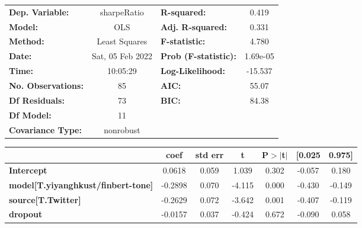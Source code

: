 \begin{center}
\begin{tabular}{lclc}
\toprule
\textbf{Dep. Variable:}                    &   sharpeRatio    & \textbf{  R-squared:         } &     0.419   \\
\textbf{Model:}                            &       OLS        & \textbf{  Adj. R-squared:    } &     0.331   \\
\textbf{Method:}                           &  Least Squares   & \textbf{  F-statistic:       } &     4.780   \\
\textbf{Date:}                             & Sat, 05 Feb 2022 & \textbf{  Prob (F-statistic):} &  1.69e-05   \\
\textbf{Time:}                             &     10:05:29     & \textbf{  Log-Likelihood:    } &   -15.537   \\
\textbf{No. Observations:}                 &          85      & \textbf{  AIC:               } &     55.07   \\
\textbf{Df Residuals:}                     &          73      & \textbf{  BIC:               } &     84.38   \\
\textbf{Df Model:}                         &          11      & \textbf{                     } &             \\
\textbf{Covariance Type:}                  &    nonrobust     & \textbf{                     } &             \\
\bottomrule
\end{tabular}
\begin{tabular}{lcccccc}
                                           & \textbf{coef} & \textbf{std err} & \textbf{t} & \textbf{P$> |$t$|$} & \textbf{[0.025} & \textbf{0.975]}  \\
\midrule
\textbf{Intercept}                         &       0.0618  &        0.059     &     1.039  &         0.302        &       -0.057    &        0.180     \\
\textbf{model[T.yiyanghkust/finbert-tone]} &      -0.2898  &        0.070     &    -4.115  &         0.000        &       -0.430    &       -0.149     \\
\textbf{source[T.Twitter]}                 &      -0.2629  &        0.072     &    -3.642  &         0.001        &       -0.407    &       -0.119     \\
\textbf{dropout}                           &      -0.0157  &        0.037     &    -0.424  &         0.672        &       -0.090    &        0.058     \\

\end{tabular}
\end{center}
